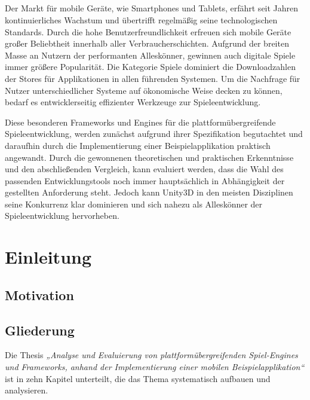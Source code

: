 \section*{\centering\abstractname}
Der Markt für mobile Geräte, wie Smartphones und Tablets, erfährt seit Jahren kontinuierliches Wachstum und übertrifft regelmäßig seine technologischen Standards. Durch die hohe Benutzerfreundlichkeit erfreuen sich mobile Geräte großer Beliebtheit innerhalb aller Verbraucherschichten. Aufgrund der breiten Masse an Nutzern der performanten Alleskönner, gewinnen auch digitale Spiele immer größere Popularität. Die Kategorie Spiele dominiert die Downloadzahlen der Stores für Applikationen in allen führenden Systemen. Um die Nachfrage für Nutzer unterschiedlicher Systeme auf ökonomische Weise decken zu können, bedarf es entwicklerseitig effizienter Werkzeuge zur Spieleentwicklung.

\bigskip
Diese besonderen Frameworks und Engines für die plattformübergreifende Spieleentwicklung, werden zunächst aufgrund ihrer Spezifikation begutachtet und daraufhin durch die Implementierung einer Beispielapplikation praktisch angewandt. Durch die gewonnenen theoretischen und praktischen Erkenntnisse und den abschließenden Vergleich, kann evaluiert werden, dass die Wahl des passenden Entwicklungstools noch immer hauptsächlich in Abhängigkeit der gestellten Anforderung steht. Jedoch kann Unity3D in den meisten Disziplinen seine Konkurrenz klar dominieren und sich nahezu als Alleskönner der Spieleentwicklung hervorheben.




\chapter{Einleitung}

\section{Motivation}
\section{Gliederung}
Die Thesis \emph{„Analyse und Evaluierung von plattformübergreifenden Spiel-Engines und Frameworks, anhand der Implementierung einer mobilen Beispielapplikation“} ist in zehn Kapitel unterteilt, die das Thema systematisch aufbauen und analysieren.

